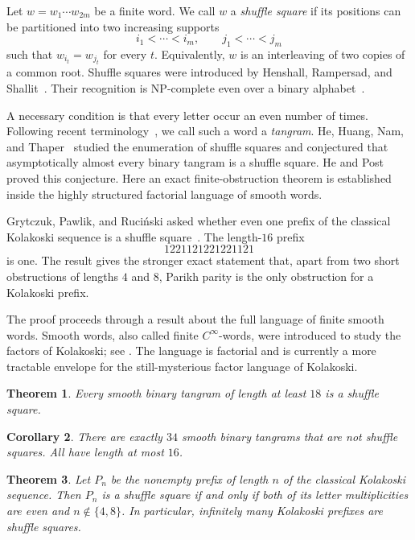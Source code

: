 \documentclass[11pt]{article}
\newtheorem{theorem}{Theorem}[section]
\newtheorem{corollary}[theorem]{Corollary}
\theoremstyle{definition}
\theoremstyle{remark}
\begin{document}
Let $w=w_1\cdots w_{2m}$ be a finite word.  We call $w$ a
\emph{shuffle square} if its positions can be partitioned into two
increasing supports
\[
 i_1<\cdots<i_m,\qquad j_1<\cdots<j_m
\]
such that $w_{i_t}=w_{j_t}$ for every $t$.  Equivalently, $w$ is an
interleaving of two copies of a common root.  Shuffle squares were
introduced by Henshall, Rampersad, and Shallit~\cite{HRS}.  Their
recognition is NP-complete even over a binary alphabet~\cite{Bulteau}.

A necessary condition is that every letter occur an even number of
times.  Following recent terminology~\cite{GPR}, we call such a word a
\emph{tangram}.  He, Huang, Nam, and Thaper~\cite{HHNT} studied the enumeration of
shuffle squares and conjectured that asymptotically almost every binary
tangram is a shuffle square. He and Post~\cite{HePost} proved this
conjecture.  Here an exact finite-obstruction theorem is established inside the highly structured
factorial language of smooth words.

Grytczuk, Pawlik, and Ruci\'{n}ski asked whether even one
prefix of the classical Kolakoski sequence is a shuffle
square~\cite[Question~1]{GPR}.  The length-$16$ prefix
\[
 1221121221221121
\]
is one.  The result gives the stronger exact statement that, apart from
two short obstructions of lengths $4$ and $8$, Parikh parity is the only
obstruction for a Kolakoski prefix.

The proof proceeds through a result about the full language of finite smooth
words.  Smooth words, also called finite $C^\infty$-words, were
introduced to study the factors of Kolakoski; see
\cite{BBC,CassaigneHenry,FedouFici,Weakley}.  The language is factorial and
is currently a more tractable envelope for the still-mysterious factor
language of Kolakoski.

\begin{theorem}\label{thm:main}
Every smooth binary tangram of length at least $18$ is a shuffle square.
\end{theorem}

\begin{corollary}\label{cor:34}
There are exactly $34$ smooth binary tangrams that are not shuffle
squares.  All have length at most $16$.
\end{corollary}

\begin{theorem}\label{thm:kolakoski}
Let $P_n$ be the nonempty prefix of length $n$ of the classical
Kolakoski sequence.  Then $P_n$ is a shuffle square if and only if both
of its letter multiplicities are even and $n\notin\{4,8\}$.  In
particular, infinitely many Kolakoski prefixes are shuffle squares.
\end{theorem}
\end{document}
